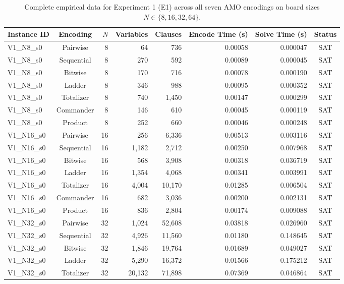 \documentclass[a4paper,fleqn]{cas-sc}
\begin{document}
\begin{table}[!htbp]
\centering
\caption{Complete empirical data for Experiment 1 (E1) across all seven AMO encodings on board sizes $N \in \{8, 16, 32, 64\}$.}
\label{tab:raw_e1_full}
\small
\begin{tabular*}{\textwidth}{lcrrrrrc}
\toprule
\textbf{Instance ID} & \textbf{Encoding} & $N$ & \textbf{Variables} & \textbf{Clauses} & \textbf{Encode Time (s)} & \textbf{Solve Time (s)} & \textbf{Status} \\
\midrule
V1\_N8\_s0 & Pairwise & 8 & 64 & 736 & 0.00058 & 0.000047 & SAT \\
V1\_N8\_s0 & Sequential & 8 & 270 & 592 & 0.00089 & 0.000045 & SAT \\
V1\_N8\_s0 & Bitwise & 8 & 170 & 716 & 0.00078 & 0.000190 & SAT \\
V1\_N8\_s0 & Ladder & 8 & 346 & 988 & 0.00095 & 0.000352 & SAT \\
V1\_N8\_s0 & Totalizer & 8 & 740 & 1,450 & 0.00147 & 0.000299 & SAT \\
V1\_N8\_s0 & Commander & 8 & 146 & 610 & 0.00045 & 0.000119 & SAT \\
V1\_N8\_s0 & Product & 8 & 252 & 660 & 0.00046 & 0.000248 & SAT \\
\midrule
V1\_N16\_s0 & Pairwise & 16 & 256 & 6,336 & 0.00513 & 0.003116 & SAT \\
V1\_N16\_s0 & Sequential & 16 & 1,182 & 2,712 & 0.00250 & 0.007968 & SAT \\
V1\_N16\_s0 & Bitwise & 16 & 568 & 3,908 & 0.00318 & 0.036719 & SAT \\
V1\_N16\_s0 & Ladder & 16 & 1,354 & 4,068 & 0.00341 & 0.003991 & SAT \\
V1\_N16\_s0 & Totalizer & 16 & 4,004 & 10,170 & 0.01285 & 0.006504 & SAT \\
V1\_N16\_s0 & Commander & 16 & 682 & 3,036 & 0.00200 & 0.002131 & SAT \\
V1\_N16\_s0 & Product & 16 & 836 & 2,804 & 0.00174 & 0.009088 & SAT \\
\midrule
V1\_N32\_s0 & Pairwise & 32 & 1,024 & 52,608 & 0.03818 & 0.026960 & SAT \\
V1\_N32\_s0 & Sequential & 32 & 4,926 & 11,560 & 0.01180 & 0.148645 & SAT \\
V1\_N32\_s0 & Bitwise & 32 & 1,846 & 19,764 & 0.01689 & 0.049027 & SAT \\
V1\_N32\_s0 & Ladder & 32 & 5,290 & 16,372 & 0.01566 & 0.175212 & SAT \\
V1\_N32\_s0 & Totalizer & 32 & 20,132 & 71,898 & 0.07369 & 0.046864 & SAT \\

\end{tabular*}
\end{table}
\end{document}
